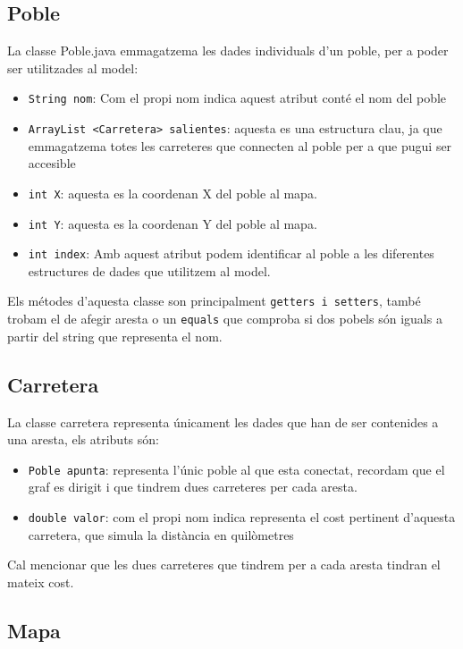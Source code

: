 \documentclass[conference]{IEEEtran}
\begin{document}
\subsection{Poble}
La classe Poble.java emmagatzema les dades individuals d'un poble, per a poder ser utilitzades al model:

    \begin{itemize}
        \item \texttt{String nom}: Com el propi nom indica aquest atribut conté el nom del poble 
        \item \texttt{ArrayList <Carretera> salientes}: aquesta es una estructura clau, ja que emmagatzema totes les carreteres que connecten al poble per a que pugui ser accesible
        \item \texttt{int X}: aquesta es la coordenan X del poble al mapa.
        \item \texttt{int Y}: aquesta es la coordenan Y del poble al mapa.
        \item \texttt{int index}: Amb aquest atribut podem identificar al poble a les diferentes estructures de dades que utilitzem al model.
        
    \end{itemize}
Els métodes d'aquesta classe son principalment \texttt{getters i setters}, també trobam el de afegir aresta o un \texttt{equals} que comproba si dos pobels són iguals a partir del string que representa el nom.
\subsection{Carretera}

La classe carretera representa únicament les dades que han de ser contenides a una aresta, els atributs són:

    \begin{itemize}
        \item \texttt{Poble apunta}: representa l'únic poble al que esta conectat, recordam que el graf es dirigit i que tindrem dues carreteres per cada aresta.
        \item \texttt{double valor}: com el propi nom indica representa el cost pertinent d'aquesta carretera, que simula la distància en quilòmetres
        
    \end{itemize}
    Cal mencionar que les dues carreteres que tindrem per a cada aresta tindran el mateix cost.

\subsection{Mapa}
\end{document}
